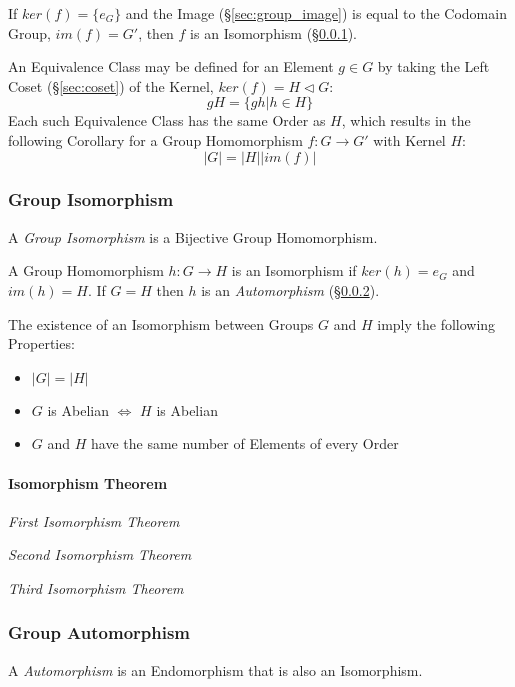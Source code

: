 If $ker(f) = \{e_G\}$ and the Image (\S\ref{sec:group_image}) is equal
to the Codomain Group, $im(f) = G'$, then $f$ is an Isomorphism
(\S\ref{sec:group_isomorphism}).

An Equivalence Class may be defined for an Element $g \in G$ by taking
the Left Coset (\S\ref{sec:coset}) of the Kernel, $ker(f) = H
\triangleleft G$:
\[
    gH = \{ gh | h \in H \}
\]
Each such Equivalence Class has the same Order as $H$, which results
in the following Corollary for a Group Homomorphism $f : G \rightarrow
G'$ with Kernel $H$:
\[
    |G| = |H||im(f)|
\]



\subsubsection{Group Isomorphism}\label{sec:group_isomorphism}

A \emph{Group Isomorphism} is a Bijective Group Homomorphism.

A Group Homomorphism $h : G \rightarrow H$ is an Isomorphism if
$ker(h) = e_G$ and $im(h) = H$. If $G = H$ then $h$ is an
\emph{Automorphism} (\S\ref{sec:group_automorphism}).

The existence of an Isomorphism between Groups $G$ and $H$ imply the
following Properties:
\begin{itemize}
    \item $|G| = |H|$
    \item $G$ is Abelian $\Leftrightarrow$ $H$ is Abelian
    \item $G$ and $H$ have the same number of Elements of every Order
\end{itemize}



\paragraph{Isomorphism Theorem}\label{sec:isomorphism_theorem}

\emph{First Isomorphism Theorem}

\emph{Second Isomorphism Theorem}

\emph{Third Isomorphism Theorem}



\subsubsection{Group Automorphism}\label{sec:group_automorphism}

A \emph{Automorphism} is an Endomorphism that is also an Isomorphism.



